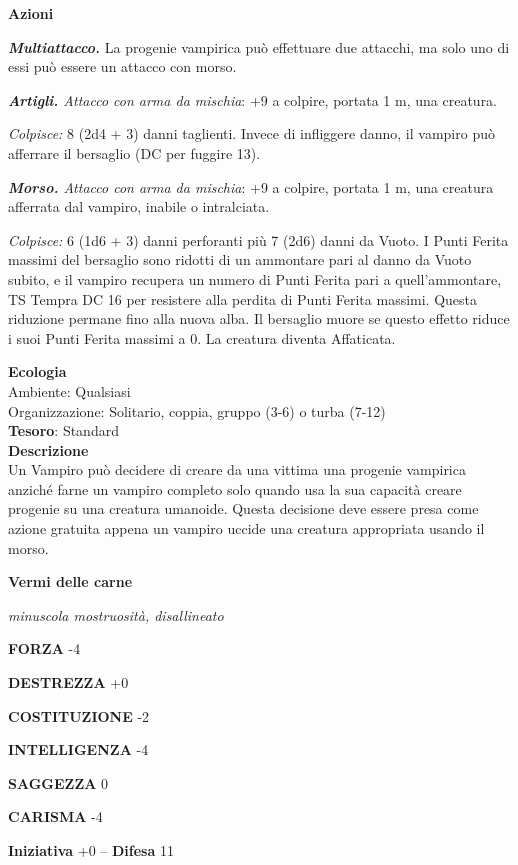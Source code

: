 \begin{multicols}{2}
	\textbf{Azioni}

	\textit{\textbf{Multiattacco.}} La progenie vampirica può effettuare due attacchi, ma solo uno di essi può essere un attacco con morso.

	\textit{\textbf{Artigli.} Attacco con arma da mischia}: +9 a colpire, portata 1 m, una creatura.

	\textit{Colpisce:} 8 (2d4 + 3) danni taglienti. Invece di infliggere danno, il vampiro può afferrare il bersaglio (DC per fuggire 13).

	\textit{\textbf{Morso.} Attacco con arma da mischia}: +9 a colpire, portata 1 m, una creatura afferrata dal vampiro, inabile o intralciata.

	\textit{Colpisce:} 6 (1d6 + 3) danni perforanti più 7 (2d6) danni da Vuoto. I Punti Ferita massimi del bersaglio sono ridotti di un ammontare pari al danno da Vuoto subito, e il vampiro recupera un numero di Punti Ferita pari a quell'ammontare, TS Tempra DC 16 per resistere alla perdita di Punti Ferita massimi. Questa riduzione permane fino alla nuova alba. Il bersaglio muore se questo effetto riduce i suoi Punti Ferita massimi a 0. La creatura diventa Affaticata.

	\textbf{Ecologia}\\
	Ambiente: Qualsiasi\\
	Organizzazione: Solitario, coppia, gruppo (3-6) o turba (7-12)\\
	\textbf{Tesoro}: Standard\\
	\textbf{Descrizione}\\
	Un Vampiro può decidere di creare da una vittima una progenie vampirica anziché farne un vampiro completo solo quando usa la sua capacità creare progenie su una creatura umanoide. Questa decisione deve essere presa come azione gratuita appena un vampiro uccide una creatura appropriata usando il morso.

	\medskip{}\textbf{Vermi delle carne}

	\textit{minuscola mostruosità, disallineato}

	\textbf{FORZA} -4

	\textbf{DESTREZZA} +0

	\textbf{COSTITUZIONE} -2

	\textbf{INTELLIGENZA} -4

	\textbf{SAGGEZZA} 0

	\textbf{CARISMA} -4

	\textbf{Iniziativa} +0 -- \textbf{Difesa} 11


\end{multicols}
